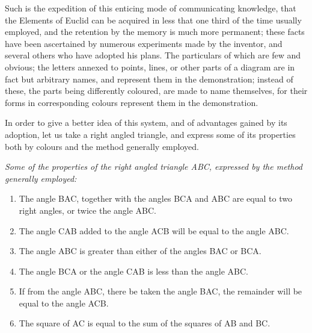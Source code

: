 \documentclass[booklanguage=english]{byrnebook}
\begin{document}
Such is the expedition of this enticing mode of communicating knowledge, that the Elements of Euclid can be acquired in less that one third of the time usually employed, and the retention by the memory is much more permanent; these facts have been ascertained by numerous experiments made by the inventor, and several others who have adopted his plans. The particulars of which are few and obvious; the letters annexed to points, lines, or other parts of a diagram are in fact but arbitrary names, and represent them in the demonstration; instead of these, the parts being differently coloured, are made to name themselves, for their forms in corresponding colours represent them in the demonstration.

In order to give a better idea of this system, and of advantages gained by its adoption, let us take a right angled triangle, and express some of its properties both by colours and the method generally employed.


\begin{center}
\drawCurrentPictureInMargin \emph{Some of the properties of the right angled triangle ABC, expressed by the method generally employed:}
\end{center}

\baselineskip

\begin{enumerate}
\item The angle BAC, together with the angles BCA and ABC are equal to two right angles, or twice the angle ABC.
\item The angle CAB added to the angle ACB will be equal to the angle ABC.
\item The angle ABC is greater than either of the angles BAC or BCA.
\item The angle BCA or the angle CAB is less than the angle ABC.
\item If from the angle ABC, there be taken the angle BAC, the remainder will be equal to the angle ACB.
\item The square of AC is equal to the sum of the squares of AB and BC.
\end{enumerate}
\end{document}
